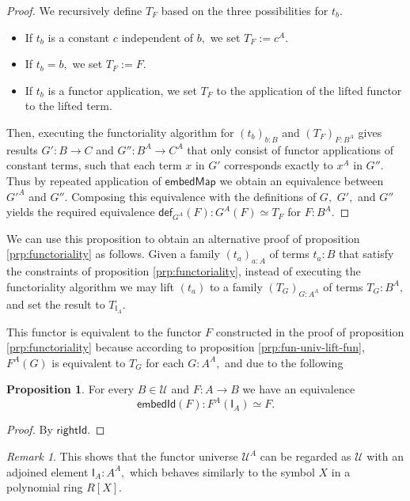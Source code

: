 \documentclass[a4paper]{article}
\theoremstyle{definition}
\newtheorem{proposition}[definition]{Proposition}
\theoremstyle{remark}
\newtheorem*{remark}{Remark}
\renewcommand{\equiv}{\simeq}
\newcommand{\U}{\mathcal{U}}
\newcommand{\nm}{\mathsf}
\newcommand{\fndef}[1]{\nm{def}_{#1}}
\newcommand{\combinator}{\nm}
\newcommand{\idFun}{\combinator{I}}
\begin{document}
\begin{proof}
  We recursively define $T_F$ based on the three possibilities for $t_b.$
  \begin{itemize}
    \item If $t_b$ is a constant $c$ independent of $b,$ we set $T_F := c^A.$
    \item If $t_b = b,$ we set $T_F := F.$
    \item If $t_b$ is a functor application, we set $T_F$ to the application of
    the lifted functor to the lifted term.
  \end{itemize}
  Then, executing the functoriality algorithm for $(t_b)_{b : B}$ and
  $(T_F)_{F : B^A}$ gives results $G' : B \to C$ and $G'' : B^A \to C^A$ that
  only consist of functor applications of constant terms, such that each term
  $x$ in $G'$ corresponds exactly to $x^A$ in $G''.$ Thus by repeated application
  of $\nm{embedMap}$ we obtain an equivalence between $G'^A$ and $G''.$ Composing
  this equivalence with the definitions of $G,$ $G',$ and $G''$ yields the
  required equivalence $\fndef{G^A}(F) : G^A(F) \equiv T_F$ for $F : B^A.$
\end{proof}

We can use this proposition to obtain an alternative proof of proposition
\ref{prp:functoriality} as follows. Given a family $(t_a)_{a : A}$ of terms
$t_a : B$ that satisfy the constraints of proposition \ref{prp:functoriality},
instead of executing the functoriality algorithm we may lift $(t_a)$ to a
family $(T_G)_{G : A^A}$ of terms $T_G : B^A,$ and set the result to
$T_{\idFun_A}.$

This functor is equivalent to the functor $F$ constructed in the proof of
proposition \ref{prp:functoriality} because according to proposition
\ref{prp:fun-univ-lift-fun}, $F^A(G)$ is equivalent to $T_G$ for each $G : A^A,$
and due to the following
\begin{proposition}
  For every $B \in \U$ and $F : A \to B$ we have an equivalence
  \[\nm{embedId}(F) : F^A(\idFun_A) \equiv F.\]
\end{proposition}
\vspace{-2ex}
\begin{proof}
  By $\nm{rightId}.$
\end{proof}

\begin{remark}
  This shows that the functor universe $\U^A$ can be regarded as $\U$ with an
  adjoined element $\idFun_A : A^A,$ which behaves similarly to the symbol $X$
  in a polynomial ring $R[X].$
\end{remark}
\end{document}
